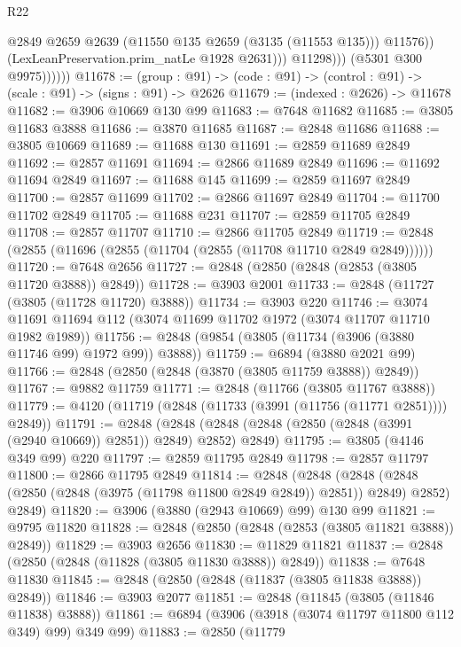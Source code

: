 \begin{lexlean}{R22}
\begin{coremodule}
                            @2849
                            @2659
                            @2639
                            (@11550 @135 @2659 (@3135 (@11553 @135)))
                            @11576))
                        (LexLeanPreservation.prim_natLe @1928 @2631)))
                    @11298)))
              (@5301 @300 @9975))))))
@11678 := (group : @91) ->
  (code : @91) -> (control : @91) -> (scale : @91) -> (signs : @91) -> @2626
@11679 := (indexed : @2626) -> @11678
@11682 := @3906 @10669 @130 @99
@11683 := @7648 @11682
@11685 := @3805 @11683 @3888
@11686 := @3870 @11685
@11687 := @2848 @11686
@11688 := @3805 @10669
@11689 := @11688 @130
@11691 := @2859 @11689 @2849
@11692 := @2857 @11691
@11694 := @2866 @11689 @2849
@11696 := @11692 @11694 @2849
@11697 := @11688 @145
@11699 := @2859 @11697 @2849
@11700 := @2857 @11699
@11702 := @2866 @11697 @2849
@11704 := @11700 @11702 @2849
@11705 := @11688 @231
@11707 := @2859 @11705 @2849
@11708 := @2857 @11707
@11710 := @2866 @11705 @2849
@11719 := @2848 (@2855 (@11696 (@2855 (@11704 (@2855 (@11708 @11710 @2849 @2849))))))
@11720 := @7648 @2656
@11727 := @2848 (@2850 (@2848 (@2853 (@3805 @11720 @3888)) @2849))
@11728 := @3903 @2001
@11733 := @2848 (@11727 (@3805 (@11728 @11720) @3888))
@11734 := @3903 @220
@11746 := @3074 @11691 @11694 @112 (@3074 @11699 @11702 @1972 (@3074 @11707 @11710 @1982 @1989))
@11756 := @2848 (@9854 (@3805 (@11734 (@3906 (@3880 @11746 @99) @1972 @99)) @3888))
@11759 := @6894 (@3880 @2021 @99)
@11766 := @2848 (@2850 (@2848 (@3870 (@3805 @11759 @3888)) @2849))
@11767 := @9882 @11759
@11771 := @2848 (@11766 (@3805 @11767 @3888))
@11779 := @4120 (@11719 (@2848 (@11733 (@3991 (@11756 (@11771 @2851)))) @2849))
@11791 := @2848
    (@2848 (@2848 (@2848 (@2850 (@2848 (@3991 (@2940 @10669)) @2851)) @2849) @2852) @2849)
@11795 := @3805 (@4146 @349 @99) @220
@11797 := @2859 @11795 @2849
@11798 := @2857 @11797
@11800 := @2866 @11795 @2849
@11814 := @2848
    (@2848
      (@2848 (@2848 (@2850 (@2848 (@3975 (@11798 @11800 @2849 @2849)) @2851)) @2849) @2852)
      @2849)
@11820 := @3906 (@3880 (@2943 @10669) @99) @130 @99
@11821 := @9795 @11820
@11828 := @2848 (@2850 (@2848 (@2853 (@3805 @11821 @3888)) @2849))
@11829 := @3903 @2656
@11830 := @11829 @11821
@11837 := @2848 (@2850 (@2848 (@11828 (@3805 @11830 @3888)) @2849))
@11838 := @7648 @11830
@11845 := @2848 (@2850 (@2848 (@11837 (@3805 @11838 @3888)) @2849))
@11846 := @3903 @2077
@11851 := @2848 (@11845 (@3805 (@11846 @11838) @3888))
@11861 := @6894 (@3906 (@3918 (@3074 @11797 @11800 @112 @349) @99) @349 @99)
@11883 := @2850
    (@11779

\end{coremodule}
\end{lexlean}
